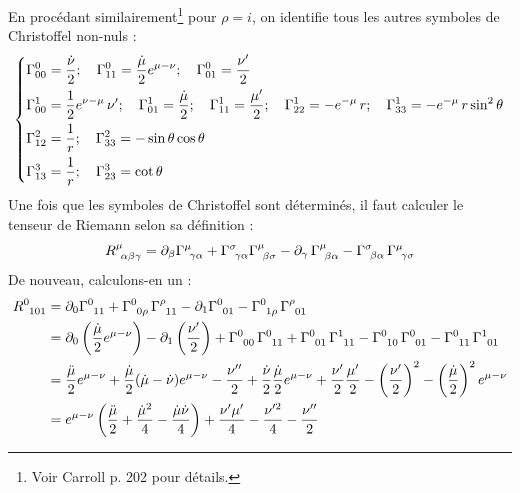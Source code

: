 En procédant similairement\footnote{Voir Carroll p. 202 pour détails.} pour $\rho = i$, on identifie tous les autres symboles de Christoffel non-nuls :
\begin{align}
    \begin{dcases}
        \Gamma^0_{00} = \frac{\dot{\nu}}{2}; \quad \Gamma^0_{11} = \frac{\dot{\mu}}{2} e^{\mu-\nu}; \quad \Gamma^0_{01} = \frac{\nu'}{2}\\
        \Gamma^1_{00} = \frac{1}{2} e^{\nu - \mu}\,  \nu' ; \quad \Gamma^1_{01} = \frac{\dot{\mu}}{2}; \quad \Gamma^1_{11} = \frac{\mu'}{2}; \quad \Gamma^1_{22} = - e^{-\mu}\, r; \quad \Gamma^1_{33}  = -e^{-\mu} \,r \sin^2 \theta\\
        \Gamma^2_{12} = \frac{1}{r}; \quad \Gamma^2_{33} = -\sin \theta \cos\theta\\
        \Gamma^3_{13} =\frac{1}{r} ; \quad \Gamma^3_{23} = \cot \theta
    \end{dcases}
\end{align}
Une fois que les symboles de Christoffel sont déterminés, il faut calculer le tenseur de Riemann selon sa définition :
\begin{equation}
    R\indices{^{\mu}_{\!\alpha \beta \gamma}} =  \partial_{\beta}\Gamma\indices{^{\mu}_{\!\gamma \alpha}} + \Gamma\indices{^{\sigma}_{\!\gamma \alpha}} \Gamma\indices{^{\mu}_{\!\beta \sigma}} - \partial_{\gamma}\,\Gamma\indices{^{\mu}_{\!\beta \alpha}} - \Gamma\indices{^{\sigma}_{\!\beta \alpha}}\,\Gamma\indices{^{\mu}_{\!\gamma \sigma}}
\end{equation}
De nouveau, calculons-en un :
\begin{align}
    R\indices{^0_{101}} &= \partial_{0}\Gamma\indices{^{0}_{11}} + \Gamma\indices{^{0}_{0 \rho}} \, \Gamma\indices{^{\rho}_{11}} - \partial_{1}\Gamma\indices{^{0}_{01}} - \Gamma\indices{^{0}_{1\rho}}\, \Gamma\indices{^{\rho}_{01}}\\
    & = \pd_0 \lt \frac{\dot{\mu}}{2} e^{\mu-\nu}\rt - \pd_1 \lt \frac{\nu'}{2} \rt + \Gamma\indices{^{0}_{00}} \, \Gamma\indices{^{0}_{11}} + \Gamma\indices{^{0}_{01}} \, \Gamma\indices{^{1}_{11}} - \Gamma\indices{^{0}_{10}} \, \Gamma\indices{^{0}_{01}} - \Gamma\indices{^{0}_{11}} \, \Gamma\indices{^{1}_{01}}\\
    &= \frac{\ddot{\mu}}{2} e^{\mu-\nu} + \frac{\dot{\mu}}{2} (\dot{\mu} - \dot{\nu}) e^{\mu-\nu} - \frac{\nu''}{2}+ \frac{\dot{\nu}}{2} \frac{\dot{\mu}}{2}e^{\mu-\nu} + \frac{\nu'}{2}\frac{\mu'}{2} - \lt \frac{\nu'}{2}\rt^2 - \lt \frac{\dot{\mu}}{2} \rt^2 e^{\mu-\nu} \\
    & = e^{\mu-\nu} \lt \frac{\ddot{\mu}}{2} + \frac{\dot{\mu}^2}{4} - \frac{\dot{\mu} \dot{\nu}}{4} \rt + \frac{\nu' \mu'}{4} - \frac{\nu'^2}{4}- \frac{\nu''}{2}
\end{align}
